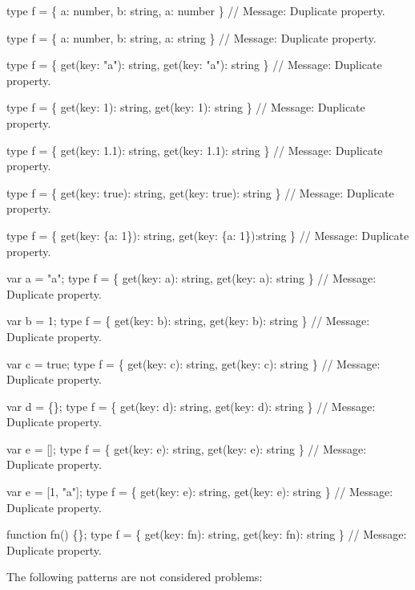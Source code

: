 \begin{DoxyCode}
type f = \{ a: number, b: string, a: number \}
// Message: Duplicate property.

type f = \{ a: number, b: string, a: string \}
// Message: Duplicate property.

type f = \{ get(key: "a"): string, get(key: "a"): string \}
// Message: Duplicate property.

type f = \{ get(key: 1): string, get(key: 1): string \}
// Message: Duplicate property.

type f = \{ get(key: 1.1): string, get(key: 1.1): string \}
// Message: Duplicate property.

type f = \{ get(key: true): string, get(key: true): string \}
// Message: Duplicate property.

type f = \{ get(key: \{a: 1\}): string, get(key: \{a: 1\}):string \}
// Message: Duplicate property.

var a = "a"; type f = \{ get(key: a): string, get(key: a): string \}
// Message: Duplicate property.

var b = 1; type f = \{ get(key: b): string, get(key: b): string \}
// Message: Duplicate property.

var c = true; type f = \{ get(key: c): string, get(key: c): string \}
// Message: Duplicate property.

var d = \{\}; type f = \{ get(key: d): string, get(key: d): string \}
// Message: Duplicate property.

var e = []; type f = \{ get(key: e): string, get(key: e): string \}
// Message: Duplicate property.

var e = [1, "a"]; type f = \{ get(key: e): string, get(key: e): string \}
// Message: Duplicate property.

function fn() \{\}; type f = \{ get(key: fn): string, get(key: fn): string \}
// Message: Duplicate property.
\end{DoxyCode}


The following patterns are not considered problems\+:


